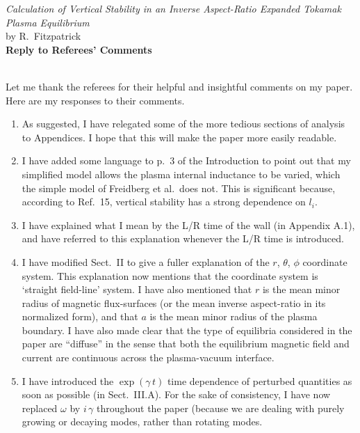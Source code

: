 \documentclass{article}[12pt]
\begin{document}
\begin{center}
{\em Calculation of Vertical Stability in an Inverse Aspect-Ratio
Expanded Tokamak Plasma Equilibrium }\\[1ex]
by R.~Fitzpatrick\\[1ex]
{\bf Reply to Referees' Comments}\\[1ex]
~
\end{center}
Let me thank the  referees for their helpful and insightful comments on my paper. Here are my responses to
their comments.

\begin{enumerate}
\item As suggested, I have relegated some of the more tedious sections of analysis to Appendices. I hope that this
will make the paper more easily readable.

\item I have added some language to p.~3 of the Introduction to point out that my simplified model allows the plasma internal
inductance to be varied, which the simple model of Freidberg et al.\ does not. This is significant because, according to Ref.~15, vertical stability
has a strong dependence on $l_i$.

\item I have explained what I mean by the L/R time of the wall (in Appendix A.1), and have referred to this explanation whenever
the L/R time is introduced. 

\item I have modified Sect.~II to give a fuller  explanation of the $r$, $\theta$, $\phi$ coordinate system. This explanation now mentions that
the coordinate system is `straight field-line' system. I have also mentioned that $r$ is the mean minor radius of magnetic
flux-surfaces (or the mean inverse aspect-ratio in its normalized form), and that $a$ is the mean minor radius of the plasma boundary. 
I have also made clear that the type of equilibria considered in the paper are ``diffuse'' in the sense that both the equilibrium magnetic
field and current are continuous across the plasma-vacuum interface. 

\item I have introduced the $\exp(\gamma\,t)$ time dependence of perturbed quantities as soon as possible (in Sect.~III.A). 
For the sake of consistency, I have now replaced $\omega$ by $i\,\gamma$ throughout the paper (because we are dealing with
purely growing or decaying modes, rather than rotating modes. 


\end{enumerate}
\end{document}
